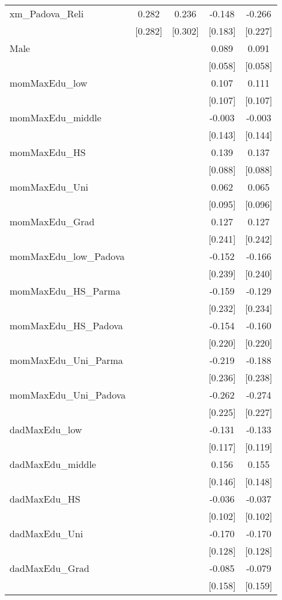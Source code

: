 \documentclass[]{article}
\begin{document}
\begin{tabular}{lcccc}
xm\_Padova\_Reli & 0.282 & 0.236 & -0.148 & -0.266 \\
 & [0.282] & [0.302] & [0.183] & [0.227] \\
Male &  &  & 0.089 & 0.091 \\
 &  &  & [0.058] & [0.058] \\
momMaxEdu\_low &  &  & 0.107 & 0.111 \\
 &  &  & [0.107] & [0.107] \\
momMaxEdu\_middle &  &  & -0.003 & -0.003 \\
 &  &  & [0.143] & [0.144] \\
momMaxEdu\_HS &  &  & 0.139 & 0.137 \\
 &  &  & [0.088] & [0.088] \\
momMaxEdu\_Uni &  &  & 0.062 & 0.065 \\
 &  &  & [0.095] & [0.096] \\
momMaxEdu\_Grad &  &  & 0.127 & 0.127 \\
 &  &  & [0.241] & [0.242] \\
momMaxEdu\_low\_Padova &  &  & -0.152 & -0.166 \\
 &  &  & [0.239] & [0.240] \\
momMaxEdu\_HS\_Parma &  &  & -0.159 & -0.129 \\
 &  &  & [0.232] & [0.234] \\
momMaxEdu\_HS\_Padova &  &  & -0.154 & -0.160 \\
 &  &  & [0.220] & [0.220] \\
momMaxEdu\_Uni\_Parma &  &  & -0.219 & -0.188 \\
 &  &  & [0.236] & [0.238] \\
momMaxEdu\_Uni\_Padova &  &  & -0.262 & -0.274 \\
 &  &  & [0.225] & [0.227] \\
dadMaxEdu\_low &  &  & -0.131 & -0.133 \\
 &  &  & [0.117] & [0.119] \\
dadMaxEdu\_middle &  &  & 0.156 & 0.155 \\
 &  &  & [0.146] & [0.148] \\
dadMaxEdu\_HS &  &  & -0.036 & -0.037 \\
 &  &  & [0.102] & [0.102] \\
dadMaxEdu\_Uni &  &  & -0.170 & -0.170 \\
 &  &  & [0.128] & [0.128] \\
dadMaxEdu\_Grad &  &  & -0.085 & -0.079 \\
 &  &  & [0.158] & [0.159] \\

\end{tabular}
\end{document}
